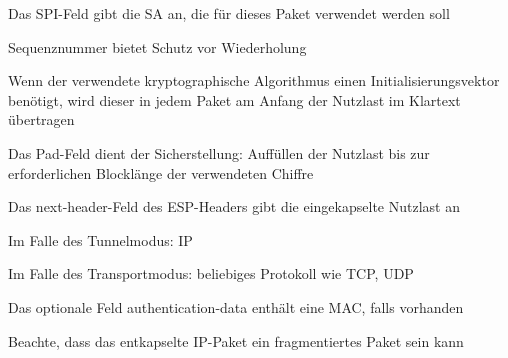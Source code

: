 \documentclass[a4paper]{article}
\begin{document}
\begin{multicols}{3}
\begin{itemize*}
            \item Das SPI-Feld gibt die SA an, die für dieses Paket verwendet werden soll
            \item Sequenznummer bietet Schutz vor Wiederholung
            \item Wenn der verwendete kryptographische Algorithmus einen Initialisierungsvektor benötigt, wird dieser in jedem Paket am Anfang der Nutzlast im Klartext übertragen
            \item Das Pad-Feld dient der Sicherstellung: Auffüllen der Nutzlast bis zur erforderlichen Blocklänge der verwendeten Chiffre
            \item Das next-header-Feld des ESP-Headers gibt die eingekapselte Nutzlast an
            \begin{itemize*}
                  \item Im Falle des Tunnelmodus: IP
                  \item Im Falle des Transportmodus: beliebiges Protokoll wie TCP, UDP
            \end{itemize*}
            \item Das optionale Feld authentication-data enthält eine MAC, falls vorhanden
            \item Beachte, dass das entkapselte IP-Paket ein fragmentiertes Paket sein kann
            \begin{itemize*}

\end{itemize*}
\end{itemize*}
\end{multicols}
\end{document}
